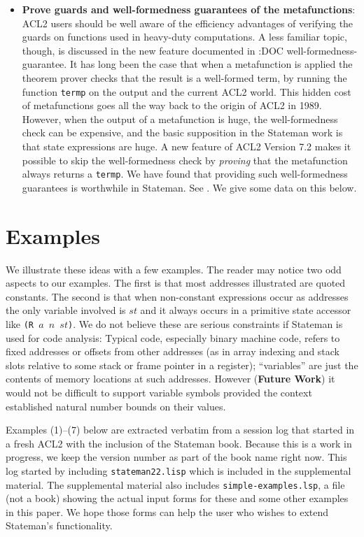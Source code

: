 \documentclass[submission,copyright,creativecommons]{eptcs}
\newcommand{\ptt}[1]{\tt{#1}}
\begin{document}
\begin{itemize}
\item {\bf{Prove guards and well-formedness guarantees of the
    metafunctions}}: ACL2 users should be well aware of the efficiency
  advantages of verifying the guards on functions used in heavy-duty
  computations. A less familiar topic, though, is discussed in the new
  feature documented in :DOC well-formedness-guarantee.  It has long been the
  case that when a metafunction is applied the theorem prover checks that the
  result is a well-formed term, by running the function {\ptt{termp}} on the
  output and the current ACL2 world.  This hidden cost of metafunctions goes
  all the way back to the origin of ACL2 in 1989.  However, when the output
  of a metafunction is huge, the well-formedness check can be expensive, and
  the basic supposition in the Stateman work is that state expressions are
  huge.  A new feature of ACL2 Version 7.2 makes it possible to skip the
  well-formedness check by {\em{proving}} that the metafunction always
  returns a {\ptt{termp}}.  We have found that providing such well-formedness
  guarantees is worthwhile in Stateman.  See \cite{wf-guarantee}.
  We give some data on this below.

\end{itemize}

\section{Examples}

We illustrate these ideas with a few examples.  The reader may notice two odd
aspects to our examples.  The first is that most addresses illustrated are
quoted constants.  The second is that when non-constant expressions occur as
addresses the only variable involved is $st$ and it always occurs in a
primitive state accessor like {\ptt{(R $a$ $n$ $st$)}}.  We do not believe
these are serious constraints if Stateman is used for code analysis: Typical
code, especially binary machine code, refers to fixed addresses or offsets
from other addresses (as in array indexing and stack slots relative to some
stack or frame pointer in a register); ``variables'' are just the
contents of memory locations at such addresses.  However ({\bf{Future Work}})
it would not be difficult to support variable symbols provided the context
established natural number bounds on their values.

Examples (1)--(7) below are extracted verbatim from a session log that
started in a fresh ACL2 with the inclusion of the Stateman book.  Because
this is a work in progress, we keep the version number as part of the book
name right now.  This log started by including {\ptt{stateman22.lisp}} which
is included in the supplemental material.  The supplemental material also
includes {\ptt{simple-examples.lsp}}, a file (not a book) showing the actual
input forms for these and some other examples in this paper.  We hope those
forms can help the user who wishes to extend Stateman's functionality.
\end{document}
